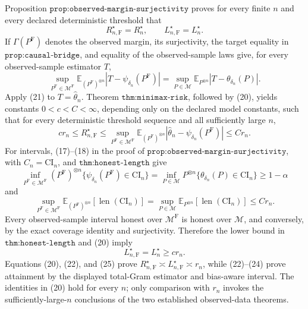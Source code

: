 Proposition \(\texttt{prop:observed-margin-surjectivity}\) proves for every finite \(n\) and every declared deterministic threshold that
\[
 R_{n,\mathrm F}^\star=R_n^\star,
 \qquad L_{n,\mathrm F}^\star=L_n^\star. \tag{20}
\]
If \(\Gamma(P^{\mathrm F})\) denotes the observed margin, its surjectivity, the target equality in \(\texttt{prop:causal-bridge}\), and equality of the observed-sample laws give, for every observed-sample estimator \(T\),
\[
 \sup_{P^{\mathrm F}\in\mathcal M^{\mathrm F}}
 \mathbb E_{(P^{\mathrm F})^{\otimes n}}
 |T-\psi_{\delta_n}(P^{\mathrm F})|
 =
 \sup_{P\in\mathcal M}
 \mathbb E_{P^{\otimes n}}|T-\theta_{\delta_n}(P)|. \tag{21}
\]
Apply (21) to \(T=\widehat\theta_n\).  Theorem \(\texttt{thm:minimax-risk}\), followed by (20), yields constants \(0<c<C<\infty\), depending only on the declared model constants, such that for every deterministic threshold sequence and all sufficiently large \(n\),
\[
 c r_n
 \leq R_{n,\mathrm F}^\star
 \leq
 \sup_{P^{\mathrm F}\in\mathcal M^{\mathrm F}}
 \mathbb E_{(P^{\mathrm F})^{\otimes n}}
 |\widehat\theta_n-\psi_{\delta_n}(P^{\mathrm F})|
 \leq C r_n. \tag{22}
\]
For intervals, (17)--(18) in the proof of \(\texttt{prop:observed-margin-surjectivity}\), with \(C_n=\mathrm{CI}_n\), and \(\texttt{thm:honest-length}\) give
\[
 \inf_{P^{\mathrm F}\in\mathcal M^{\mathrm F}}
 (P^{\mathrm F})^{\otimes n}
 \{\psi_{\delta_n}(P^{\mathrm F})\in\mathrm{CI}_n\}
 =
 \inf_{P\in\mathcal M}P^{\otimes n}
 \{\theta_{\delta_n}(P)\in\mathrm{CI}_n\}
 \geq1-\alpha \tag{23}
\]
and
\[
 \sup_{P^{\mathrm F}\in\mathcal M^{\mathrm F}}
 \mathbb E_{(P^{\mathrm F})^{\otimes n}}[\operatorname{len}(\mathrm{CI}_n)]
 =
 \sup_{P\in\mathcal M}
 \mathbb E_{P^{\otimes n}}[\operatorname{len}(\mathrm{CI}_n)]
 \leq C r_n. \tag{24}
\]
Every observed-sample interval honest over \(\mathcal M^{\mathrm F}\) is honest over \(\mathcal M\), and conversely, by the exact coverage identity and surjectivity.  Therefore the lower bound in \(\texttt{thm:honest-length}\) and (20) imply
\[
 L_{n,\mathrm F}^\star=L_n^\star\geq c r_n. \tag{25}
\]
Equations (20), (22), and (25) prove \(R_{n,\mathrm F}^\star\asymp L_{n,\mathrm F}^\star\asymp r_n\), while (22)--(24) prove attainment by the displayed total-Gram estimator and bias-aware interval.  The identities in (20) hold for every \(n\); only comparison with \(r_n\) invokes the sufficiently-large-\(n\) conclusions of the two established observed-data theorems.